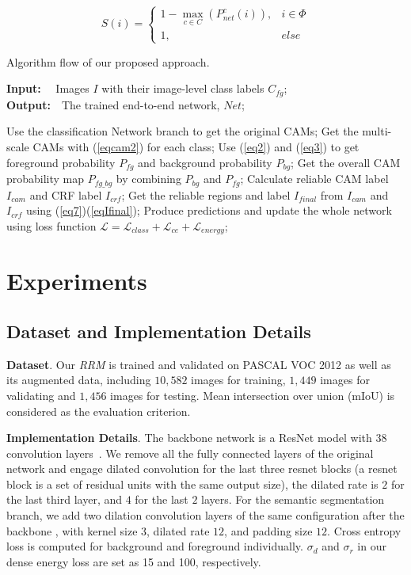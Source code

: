 \documentclass[letterpaper]{article} \usepackage{aaai20}  \usepackage{times}  \usepackage{helvet} \usepackage{courier}  \usepackage[hyphens]{url}  \usepackage{graphicx} \urlstyle{rm} \def\UrlFont{\rm}  \usepackage{graphicx}  \frenchspacing  \setlength{\pdfpagewidth}{8.5in}  \setlength{\pdfpageheight}{11in}
\begin{document}
\begin{equation}
S(i) = \left\{\begin{matrix}
1- \max\limits_{c \in C}(P_{net}^{c}(i)), & i \in \Phi   \\  
1, & else
\end{matrix}\right.
\end{equation}  


\begin{algorithm}[htb] 
	\caption{Algorithm flow  of our proposed approach.} 
	\label{alg:Framwork} 
		{\bf Input:} ~~Images $I$ with their image-level class labels $C_{fg}$;\\
		{\bf Output:}~~The trained end-to-end network, $Net$;
			
	\begin{algorithmic}[1] 		
		\STATE Use the classification Network branch to get the original CAMs;
    	\STATE Get the multi-scale CAMs with (\ref{eqcam2}) for each class;
		\STATE Use (\ref{eq2}) and (\ref{eq3}) to get foreground probability $P_{fg}$ and background probability $P_{bg}$;
		\STATE Get the overall CAM probability map $P_{fg\_bg}$ by combining  $P_{bg}$ and $P_{fg}$;
		\STATE Calculate reliable CAM label $I_{cam}$ and CRF label $I_{crf}$;
		\STATE Get the reliable regions and label $I_{final}$ from $I_{cam}$ and $I_{crf}$ using (\ref{eq7})(\ref{eqIfinal});
		\STATE Produce predictions and update the whole network using loss function $\mathcal{L} =  \mathcal{L}_{class} + \mathcal{L}_{ce} + \mathcal{L}_{energy}$;
		\ENDWHILE
		
	\end{algorithmic}
\end{algorithm}
\section{Experiments}
\subsection{Dataset and Implementation Details}\label{sec4}

\textbf{Dataset}. Our \emph{RRM} is trained and validated on PASCAL VOC 2012 \cite{everingham2010pascal} as well as its augmented data, including $10,582$ images for training, $1,449$ images for validating and $1,456$ images for testing. Mean intersection over union (mIoU) is considered as the evaluation criterion.

\noindent\textbf{Implementation Details}. The backbone network is a ResNet model with $38$ convolution layers~\cite{wu2019wider}. We remove all the fully connected layers of the original network and engage dilated convolution for the last three resnet blocks (a resnet block is a set of residual units with the same output size), the dilated rate is $2$ for the last third layer, and $4$ for the last $2$ layers. For the semantic segmentation branch, we add two dilation convolution layers of the same configuration after the backbone \cite{wu2019wider}, with kernel size $3$, dilated rate $12$, and padding size $12$. Cross entropy loss is computed for background and foreground individually. $\sigma_{d}$ and $\sigma_{r}$ in our dense energy loss are set as 15 and 100, respectively. 
\end{document}
